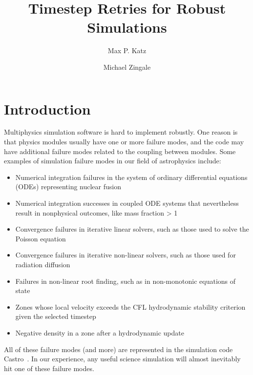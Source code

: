 \documentclass[times,modern]{elsarticle}
\newcommand{\castro}{{\sf Castro}}
\begin{document}
\title{Timestep Retries for Robust Simulations}

\author{Max P. Katz}
\author{Michael Zingale}

\maketitle

\begin{abstract}
\end{abstract}

\section{Introduction}\label{Sec:Introduction}

Multiphysics simulation software is hard to implement robustly. One reason is that
physics modules usually have one or more failure modes, and the code may have
additional failure modes related to the coupling between modules. Some examples of
simulation failure modes in our field of astrophysics include:
\begin{itemize}
  \item Numerical integration failures in the system of ordinary differential equations (ODEs) representing nuclear fusion
  \item Numerical integration successes in coupled ODE systems that nevertheless result in nonphysical outcomes, like mass fraction > 1
  \item Convergence failures in iterative linear solvers, such as those used to solve the Poisson equation
  \item Convergence failures in iterative non-linear solvers, such as those used for radiation diffusion
  \item Failures in non-linear root finding, such as in non-monotonic equations of state
  \item Zones whose local velocity exceeds the CFL hydrodynamic stability criterion given the selected timestep
  \item Negative density in a zone after a hydrodynamic update
\end{itemize}
All of these failure modes (and more) are represented in the simulation code \castro\ \citep{castro_joss}.
In our experience, any useful science simulation will almost inevitably hit one of these failure modes.
\end{document}
